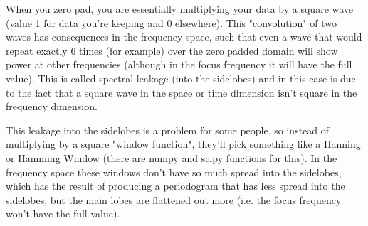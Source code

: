 When you zero pad, you are essentially multiplying your data by a square wave (value 1 for data you're keeping and 0 elsewhere). This "convolution" of two waves has consequences in the frequency space, such that even a wave that would repeat exactly 6 times (for example) over the zero padded domain will show power at other frequencies (although in the focus frequency it will have the full value). This is called spectral leakage (into the sidelobes) and in this case is due to the fact that a square wave in the space or time dimension isn't square in the frequency dimension.

This leakage into the sidelobes is a problem for some people, so instead of multiplying by a square "window function", they'll pick something like a Hanning or Hamming Window (there are numpy and scipy functions for this). In the frequency space these windows don't have so much spread into the sidelobes, which has the result of producing a periodogram that has less spread into the sidelobes, but the main lobes are flattened out more (i.e. the focus frequency won't have the full value).



